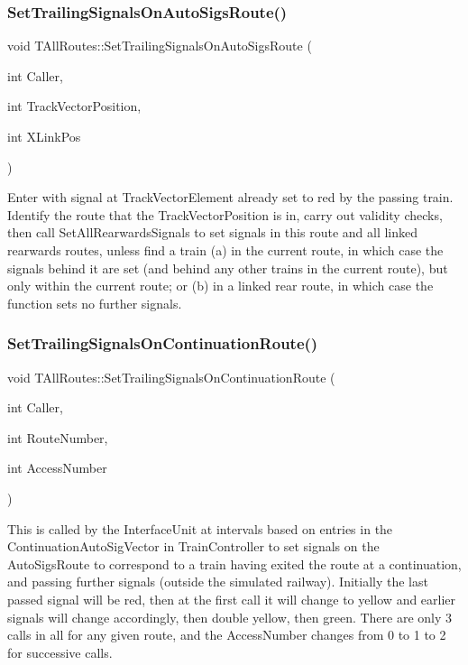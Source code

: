 \subsubsection{\texorpdfstring{Set\+Trailing\+Signals\+On\+Auto\+Sigs\+Route()}{SetTrailingSignalsOnAutoSigsRoute()}}
{\footnotesize\ttfamily void T\+All\+Routes\+::\+Set\+Trailing\+Signals\+On\+Auto\+Sigs\+Route (\begin{DoxyParamCaption}\item[{int}]{Caller,  }\item[{int}]{Track\+Vector\+Position,  }\item[{int}]{X\+Link\+Pos }\end{DoxyParamCaption})}

Enter with signal at Track\+Vector\+Element already set to red by the passing train. Identify the route that the Track\+Vector\+Position is in, carry out validity checks, then call Set\+All\+Rearwards\+Signals to set signals in this route and all linked rearwards routes, unless find a train (a) in the current route, in which case the signals behind it are set (and behind any other trains in the current route), but only within the current route; or (b) in a linked rear route, in which case the function sets no further signals. \mbox{\label{class_t_all_routes_a18177a40331bb96bbec791245b541f47}} 
\subsubsection{\texorpdfstring{Set\+Trailing\+Signals\+On\+Continuation\+Route()}{SetTrailingSignalsOnContinuationRoute()}}
{\footnotesize\ttfamily void T\+All\+Routes\+::\+Set\+Trailing\+Signals\+On\+Continuation\+Route (\begin{DoxyParamCaption}\item[{int}]{Caller,  }\item[{int}]{Route\+Number,  }\item[{int}]{Access\+Number }\end{DoxyParamCaption})}

This is called by the Interface\+Unit at intervals based on entries in the Continuation\+Auto\+Sig\+Vector in Train\+Controller to set signals on the Auto\+Sigs\+Route to correspond to a train having exited the route at a continuation, and passing further signals (outside the simulated railway). Initially the last passed signal will be red, then at the first call it will change to yellow and earlier signals will change accordingly, then double yellow, then green. There are only 3 calls in all for any given route, and the Access\+Number changes from 0 to 1 to 2 for successive calls. \mbox{\label{class_t_all_routes_af70c07d73f0b62ed85bbebc5451d009c}} 
